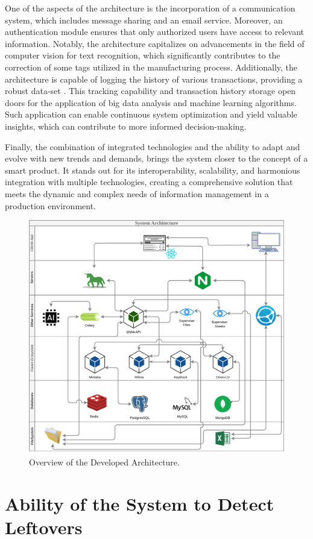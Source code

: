 One of the  aspects of the architecture is the incorporation of a communication system, which includes message sharing and an email service. Moreover, an authentication module ensures that only authorized users have access to relevant information. Notably, the architecture capitalizes on advancements in the field of computer vision for text recognition, which significantly contributes to the correction of some tags utilized in the manufacturing process. Additionally, the architecture is capable of logging the history of various transactions, providing a robust data-set . This tracking capability and transaction history storage open doors for the application of big data analysis and machine learning algorithms. Such application can enable continuous system optimization and yield valuable insights, which can contribute to more informed decision-making.

Finally, the combination of integrated technologies and the ability to adapt and evolve with new trends and demands, brings the system closer to the concept of a smart product. It stands out for its interoperability, scalability, and harmonious integration with multiple technologies, creating a comprehensive solution that meets the dynamic and complex needs of information management in a production environment.

\begin{figure}[!ht]
    \centering
    \includegraphics[width=0.75\linewidth]{images/chap5/Arch.pdf}
    \caption{Overview of the Developed Architecture.}
    \label{fig:arch-overview}
\end{figure}

\section{Ability of the System to Detect Leftovers}

